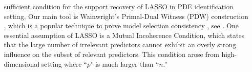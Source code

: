 \documentclass[a4paper,11pt]{article}
\theoremstyle{definition}
\newcommand{\mei}[1]{\color{blue}{#1 }\color{black}}
\begin{document}
\mei{From the theoretical point of view, our paper is the first work to provide the theoretical justification of $\ell_1$ LASSO with local polynomial approximation in PDE identification problem. Our main theoretical contribution is to establish a reasonable} sufficient condition for the support recovery of LASSO in PDE identification setting, \mei{thereby bridging the gap between practice and theory.} Our main tool is Wainwright's Primal-Dual Witness (PDW) construction \cite{wainwright2009sharp}, which  is a popular  technique to prove model selection consistency \mei{in statistics and machine learning}, see  \cite{ravikumar2010high,ravikumar2009sparse,ravikumar2011high,obozinski2008union,wang2013block,jalali2010dirty}.
One essential assumption of LASSO is  a Mutual Incoherence Condition, which states that the large number of irrelevant predictors cannot exhibit an overly strong influence on the subset of relevant predictors. This condition arose from high-dimensional setting where ``$p$" is much larger than ``$n$." \mei{Here we  express this condition explicitly in the PDE context, and demonstrate that it is reasonable for PDE identification.}

\end{document}
